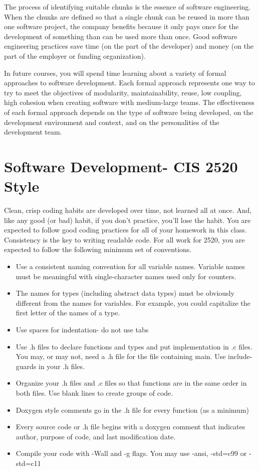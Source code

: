 The process of identifying suitable chunks is the essence of software engineering.   When the chunks are defined so that a single chunk can be reused in more than one software project, the company benefits because it only pays once for the development of something than can be used more than once.  Good software engineering   practices save time (on the part of the developer) and money (on the part of the employer or funding organization).


In future courses, you will spend time learning about a variety of formal approaches to software development.    Each formal approach represents one way to try to meet the objectives of modularity, maintainability, reuse, low coupling, high cohesion when creating software with medium-large teams. The effectiveness of each formal approach depends on the type of software being developed, on the development environment and context, and on the personalities of the development team.


\section{Software Development- CIS 2520 Style}

Clean, crisp coding habits are developed over time, not learned all at once.   And, like any good (or bad) habit, if you don’t practice, you’ll lose the habit.   You are expected to follow good coding practices for all of your homework in this class.     Consistency is the key to writing readable code.   For all work for 2520, you are expected to follow the following minimum set of conventions.

\begin{itemize}

\item Use a consistent naming convention for all variable names.  Variable names must be meaningful with single-character names used only for counters.
\item The names for types (including abstract data types) must be obviously different from the names for variables.  For example, you could capitalize the first letter of the names of a type.
\item Use spaces for indentation- do not use tabs
\item Use .h files to declare functions and types and put implementation in .c files.  You may, or may not, need a .h file for the file containing main.   Use include-guards in your .h files.
\item Organize your .h files and .c files so that functions are in the same order in both files.  Use blank lines to create groups of code.   
\item Doxygen style comments go in the .h file for every function (as a minimum)  
\item Every source code  or .h file begins with a doxygen comment  that indicates author, purpose of code, and last modification date.
\item Compile your code with -Wall and -g flags.  You may use -ansi, -std=c99 or -std=c11
\end{itemize}


